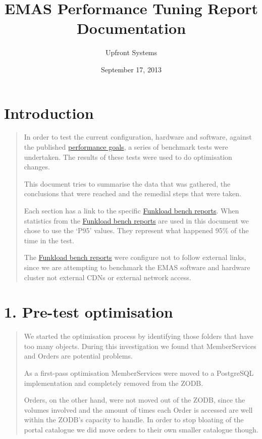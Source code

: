 \documentclass[letterpaper,10pt,english]{sphinxmanual}
\title{EMAS Performance Tuning Report Documentation}
\date{September 17, 2013}
\author{Upfront Systems}
\begin{document}
\maketitle
\tableofcontents
{}\label{index::doc}



\chapter{Introduction}
\label{index:introduction}\label{index:siyavula-performance-tuning-report}\begin{quote}

In order to test the current configuration, hardware and software, against
the published \href{https://docs.google.com/a/upfrontsystems.co.za/document/d/1GUjwcpHBpLILQozouukxVQBLB1-GQvdUa6UXfpv75-M/edit\#}{performance goals}, a series of benchmark tests were
undertaken.  The results of these tests were used to do optimisation changes.

This document tries to summarise the data that was gathered, the conclusions
that were reached and the remedial steps that were taken.

Each section has a link to the specific \href{http://197.221.50.101/stats/}{Funkload bench reports}.  When
statistics from the \href{http://197.221.50.101/stats/}{Funkload bench reports} are used in this document
we chose to use the `P95' values.  They represent what happened 95\% of the
time in the test.

The \href{http://197.221.50.101/stats/}{Funkload bench reports} were configure not to follow external links,
since we are attempting to benchmark the EMAS software and hardware cluster
not external CDNs or external network access.
\end{quote}


\chapter{1. Pre-test optimisation}
\label{index:pre-test-optimisation}\begin{quote}

We started the optimisation process by identifying those folders that have
too many objects.  During this investigation we found that MemberServices
and Orders are potential problems.

As a first-pass optimisation MemberServices were moved to a PostgreSQL
implementation and completely removed from the ZODB.

Orders, on the other hand, were not moved out of the ZODB, since the volumes
involved and the amount of times each Order is accessed are well within the
ZODB's capacity to handle.  In order to stop bloating of the portal
catalogue we did move orders to their own smaller catalogue though.
\end{quote}
\end{document}
